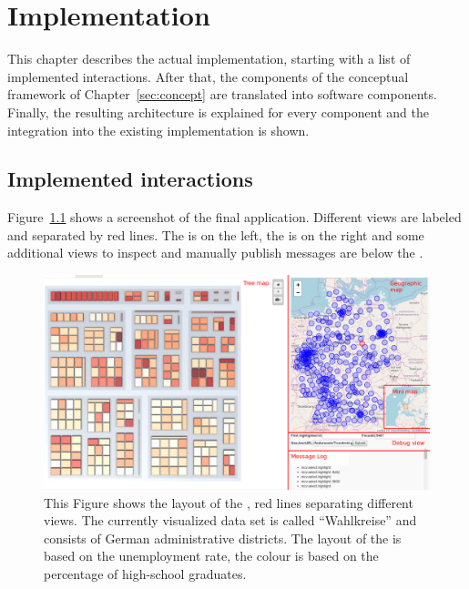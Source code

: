 \chapter{Implementation}\label{sec:implementation}

This chapter describes the actual implementation, starting with a list of implemented interactions.
After that, the components of the conceptual framework of Chapter~\ref{sec:concept} are translated into software components.
Finally, the resulting architecture is explained for every component and the integration into the existing \tmap{} implementation is shown.

\section{Implemented interactions}

Figure~\ref{fig:implementation:layout} shows a screenshot of the final \cmv{} application.
Different views are labeled and separated by red lines.
The \tmap{} is on the left, the \gv{} is on the right and some additional views to inspect and manually publish messages are below the \gv{}.

\begin{figure}[ht]
  \centering
  \includegraphics[width=\textwidth]{figures/implementation/Layout}
  \caption{%
    This Figure shows the layout of the \cmv{}, red lines separating different views.
    The currently visualized data set is called ``Wahlkreise'' and consists of German administrative districts.
    The layout of the \tmap{} is based on the unemployment rate, the colour is based on the percentage of high-school graduates.
  }\label{fig:implementation:layout}
\end{figure}

